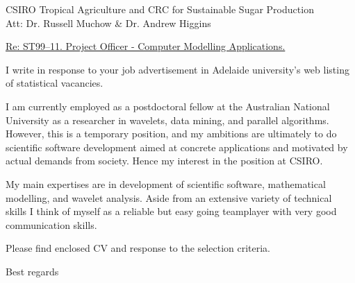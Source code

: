 \documentclass[12pt]{letter}
\begin{document}
\address{       Dr.\ Ole M{\o}ller Nielsen     \\
                Computer Sciences Laboratory, RSISE   \\
                Australian National University \\
		Canberra, ACT 0200     \\
                Ph: +61 2 6279 8627 \\
                email: Ole.Nielsen@anu.edu.au}


\signature{Ole M{\o}ller Nielsen}

\begin{letter}
{CSIRO Tropical Agriculture and CRC for Sustainable Sugar Production\\
 Att: Dr. Russell Muchow \& Dr. Andrew Higgins}
 
\opening{\underline{Re: ST99--11. Project Officer - Computer Modelling Applications.}}

I write in response to your job advertisement in 
Adelaide university's web listing of statistical
vacancies.

I am currently employed as a postdoctoral fellow at the 
Australian National University as a researcher in 
wavelets, data mining, and parallel algorithms.
However, this is a temporary position, and my ambitions
are ultimately to do scientific software development
aimed at concrete applications and motivated by actual 
demands from society. 
Hence my interest in the position at CSIRO.

My main expertises are in development of scientific software,
mathematical modelling, and wavelet analysis.
Aside from an extensive variety of technical skills 
I think of myself as a reliable but easy going teamplayer with 
very good communication skills.


Please find enclosed CV and response to the selection criteria. 

\vspace{1cm}
\closing{Best regards}

\end{letter}
\end{document}
